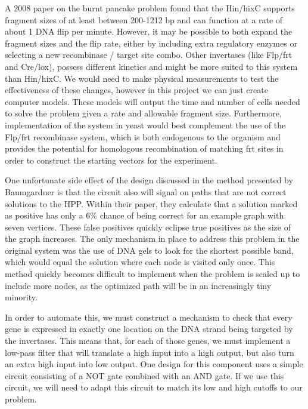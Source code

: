 \documentclass{article}
\begin{document}
A 2008 paper on the burnt pancake problem found that the Hin/hixC supports fragment sizes of at least between 200-1212 bp and can function at a rate of about 1 DNA flip per minute\cite{Haynes2008}. However, it may be possible to both expand the fragment sizes and the flip rate, either by including extra regulatory enzymes or selecting a new recombinase / target site combo. Other invertases (like Flp/frt and Cre/lox), possess different kinetics and might be more suited to this system than Hin/hixC. We would need to make physical measurements to test the effectiveness of these changes, however in this project we can just create computer models. These models will output the time and number of cells needed to solve the problem given a rate and allowable fragment size. Furthermore, implementation of the system in yeast would best complement the use of the Flp/frt recombinase system, which is both endogenous to the organism and provides the potential for homologous recombination of matching frt sites in order to construct the starting vectors for the experiment.

One unfortunate side effect of the design discussed in the method presented by Baumgardner is that the circuit also will signal on paths that are not correct solutions to the HPP. Within their paper, they calculate that a solution marked as positive has only a 6\% chance of being correct for an example graph with seven vertices\cite{Baumgardner2009}. These false positives quickly eclipse true positives as the size of the graph increases. The only mechanism in place to address this problem in the original system was the use of DNA gels to look for the shortest possible band, which would equal the solution where each node is visited only once. This method quickly becomes difficult to implement when the problem is scaled up to include more nodes, as the optimized path will be in an increasingly tiny minority.

In order to automate this, we must construct a mechanism to check that every gene is expressed in exactly one location on the DNA strand being targeted by the invertases. This means that, for each of those genes, we must implement a low-pass filter that will translate a high input into a high output, but also turn an extra high input into low output. One design for this component uses a simple circuit consisting of a NOT gate combined with an AND gate\cite{Sohka2009}. If we use this circuit, we will need to adapt this circuit to match its low and high cutoffs to our problem.
\end{document}
